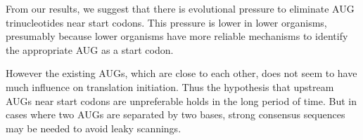 From our results, we suggest that there is evolutional pressure to 
eliminate AUG trinucleotides near start codons. This pressure is 
lower in lower organisms, presumably because lower organisms have
more reliable mechanisms to identify the appropriate AUG as a start codon.

However the existing AUGs, which are close to each other, does not
seem to have much influence on translation initiation. Thus the
hypothesis that upstream AUGs near start codons are
unpreferable holds in the long period of time. But in cases where two
AUGs are separated by two bases, strong consensus sequences may be 
needed to avoid leaky scannings.

